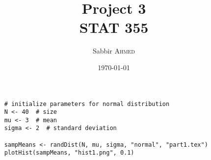 \documentclass[paper=letter, fontsize=11pt]{article}
\title{Project 3 \\ STAT 355}  %
\author{Sabbir \textsc{Ahmed}}  %
\date{\today}  %
\begin{document}
    \maketitle %


\begin{lstlisting}
    # initialize parameters for normal distribution
    N <- 40  # size
    mu <- 3  # mean
    sigma <- 2  # standard deviation

    sampMeans <- randDist(N, mu, sigma, "normal", "part1.tex")
    plotHist(sampMeans, "hist1.png", 0.1)
\end{lstlisting}

        






\end{document}

